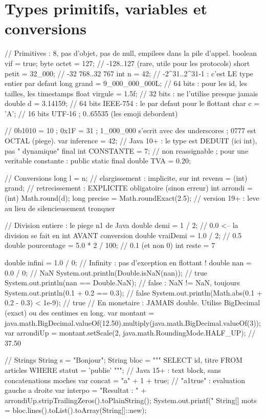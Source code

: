 \section{Types primitifs, variables et conversions}

\begin{codejava}
// Primitives : 8, pas d'objet, pas de null, empilees dans la pile d'appel.
boolean vif = true;
byte octet = 127;                    // -128..127 (rare, utile pour les protocols)
short petit = 32_000;                // -32 768..32 767
int n = 42;                          // -2^31..2^31-1 : c'est LE type entier par defaut
long grand = 9_000_000_000L;         // 64 bits : pour les id, les tailles, les timestamps
float virgule = 1.5f;                // 32 bits : ne l'utilise presque jamais
double d = 3.14159;                  // 64 bits IEEE-754 : le par defaut pour le flottant
char c = 'A';                        // 16 bits UTF-16 ; 0..65535 (les emoji debordent)

// 0b1010 = 10 ; 0x1F = 31 ; 1_000_000 s'ecrit avec des underscores ; 0777 est OCTAL (piege).
var inference = 42;                  // Java 10+ : le type est DEDUIT (ici int), pas " dynamique"
final int CONSTANTE = 7;             // non reassignable ; pour une veritable constante :
public static final double TVA = 0.20;

// Conversions
long l = n;                          // elargissement : implicite, sur
int revenu = (int) grand;             // retrecissement : EXPLICITE obligatoire (sinon erreur)
int arrondi = (int) Math.round(d);
long precise = Math.roundExact(2.5); // version 19+ : leve au lieu de silencieusement tronquer

// Division entiere : le piege n1 de Java
double demi = 1 / 2;                 // 0.0  <-- la division se fait en int AVANT conversion
double vraiDemi = 1.0 / 2;           // 0.5
double pourcentage = 5.0 * 2 / 100;  // 0.1 (et non 0)
int reste = 7 %

double infini = 1.0 / 0;              // Infinity : pas d'exception en flottant !
double nan = 0.0 / 0;                 // NaN
System.out.println(Double.isNaN(nan));          // true
System.out.println(nan == Double.NaN);          // false : NaN != NaN, toujours
System.out.println(0.1 + 0.2 == 0.3);           // false
System.out.println(Math.abs(0.1 + 0.2 - 0.3) < 1e-9);  // true
// En monetaire : JAMAIS double. Utilise BigDecimal (exact) ou des centimes en long.
var montant = java.math.BigDecimal.valueOf(12.50).multiply(java.math.BigDecimal.valueOf(3));
var arrondiUp = montant.setScale(2, java.math.RoundingMode.HALF_UP);   // 37.50

// Strings
String s = "Bonjour";
String bloc = """
    SELECT id, titre
    FROM   articles
    WHERE  statut = 'publie'
    """;                               // Java 15+ : text block, sans concatenations moches
var concat = "a" + 1 + true;           // "a1true" : evaluation gauche a droite
var interpo = "Resultat : " + arrondiUp.stripTrailingZeros().toPlainString();
System.out.printf("%
String[] mots = bloc.lines().toList().toArray(String[]::new);
\end{codejava}


